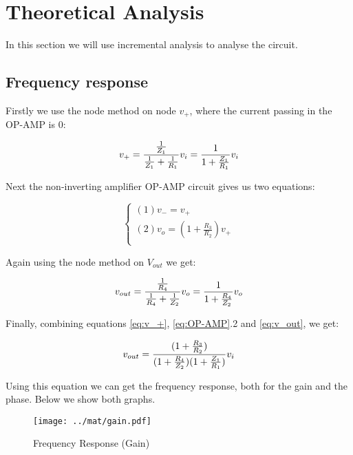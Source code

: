 \section{Theoretical Analysis}
\label{sec:analysis}
In this section we will use incremental analysis to analyse the circuit.
\par

\subsection{Frequency response}
Firstly we use the node method on node $v_+$, where the current passing in the OP-AMP is 0:

\begin{equation}\label{eq:v_+}
v_+=\frac{\frac{1}{Z_1}}{\frac{1}{Z_1}+\frac{1}{R_1}} v_i = \frac{1}{1+\frac{Z_1}{R_1}} v_i\\
\end{equation}

Next the non-inverting amplifier OP-AMP circuit gives us two equations:

\begin{equation}\label{eq:OP-AMP}
\begin{cases}
(1)  v_-=v_+\\
(2)  v_o=(1+\frac{R_3}{R_2})v_+\\
\end{cases}
\end{equation}

Again using the node method on $V_{out}$ we get:

\begin{equation}\label{eq:v_out}
v_{out}=\frac{\frac{1}{R_4}}{\frac{1}{R_4}+\frac{1}{Z_2}} v_o = \frac{1}{1+\frac{R_4}{Z_2}} v_o\\
\end{equation}

Finally, combining equations \ref{eq:v_+}, \ref{eq:OP-AMP}.2 and \ref{eq:v_out}, we get:

\begin{equation}\label{eq:v_final}
v_{out}=\frac{(1+\frac{R_3}{R_2})}{(1+\frac{R_4}{Z_2})(1+\frac{Z_1}{R_1})} v_i\\
\end{equation}

Using this equation we can get the frequency response, both for the gain and the phase. Below we show both graphs.
\par

\begin{figure}[H] \centering
\texttt{[image: ../mat/gain.pdf]}
\caption{Frequency Response (Gain)}
\label{fig:freq}
\end{figure}

